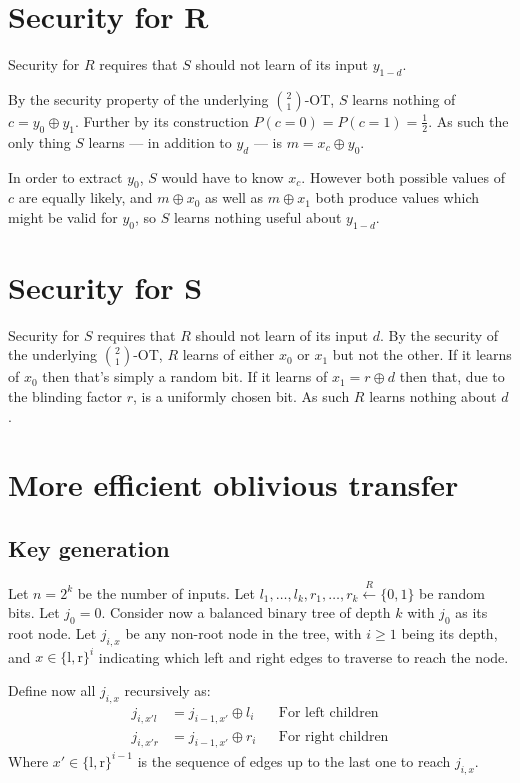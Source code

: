 \documentclass[a4paper]{scrreprt}
\begin{document}
\section{Security for R}

Security for $R$ requires that $S$ should not learn of its input $y_{1-d}$.

By the security property of the underlying $\binom{2}{1}$-OT, $S$ learns
nothing of $c = y_0 \oplus y_1$. Further by its construction $P(c = 0) = P(c =
1) = \frac{1}{2}$. As such the only thing $S$ learns --- in addition to $y_d$
--- is $m = x_c \oplus y_0$.

In order to extract $y_0$, $S$ would have to know $x_c$. However both possible
values of $c$ are equally likely, and $m \oplus x_0$ as well as $m \oplus x_1$
both produce values which might be valid for $y_0$, so $S$ learns nothing
useful about $y_{1-d}$.

\section{Security for S}

Security for $S$ requires that $R$ should not learn of its input $d$. By the
security of the underlying $\binom{2}{1}$-OT, $R$ learns of either $x_0$ or
$x_1$ but not the other. If it learns of $x_0$ then that's simply a random bit.
If it learns of $x_1 = r \oplus d$ then that, due to the blinding factor $r$,
is a uniformly chosen bit. As such $R$ learns nothing about $d$.


\section{More efficient oblivious transfer}

\subsection{Key generation}

Let $n = 2^k$ be the number of inputs. Let $l_1, \ldots, l_k, r_1, \ldots, r_k
\xleftarrow{R} \{0, 1\}$ be random bits. Let $j_0 = 0$. Consider now a balanced
binary tree of depth $k$ with $j_0$ as its root node. Let $j_{i, x}$ be any
non-root node in the tree, with $i \geq 1$ being its depth, and $x \in \{\text{l},
\text{r}\}^i$ indicating which left and right edges to traverse to reach the node.

Define now all $j_{i, x}$ recursively as:
\begin{align*}
		j_{i, x'l} & = j_{i - 1, x'} \oplus l_i && \text{For left children} \\
		j_{i, x'r} & = j_{i - 1, x'} \oplus r_i && \text{For right children}
\end{align*}
Where $x' \in \{\text{l}, \text{r}\}^{i-1}$ is the sequence of edges up to the
last one to reach $j_{i, x}$.
\end{document}
